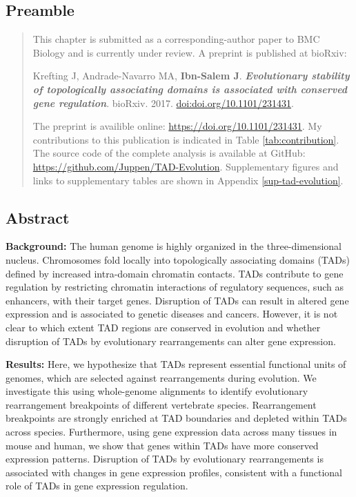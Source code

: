 \documentclass[a4paper,twoside=true,openright,parskip=full,chapterprefix=true,11pt,headings=normal,bibliography=totoc,listof=totoc,titlepage=on,captions=tableabove,draft=false]{scrreprt}
\theoremstyle{definition}
\theoremstyle{definition}
\theoremstyle{definition}
\theoremstyle{remark}
\begin{document}
\hypertarget{preamble-1}{%
\subsection*{Preamble}\label{preamble-1}}

\begin{quote}
This chapter is submitted as a corresponding-author paper to BMC Biology
and is currently under review. A preprint is published at bioRxiv:

Krefting J, Andrade-Navarro MA, \textbf{Ibn-Salem J}.
\textbf{\emph{Evolutionary stability of topologically associating
domains is associated with conserved gene regulation}}. bioRxiv. 2017.
\href{https://doi.org/10.1101/231431}{doi:doi.org/10.1101/231431}.

The preprint is availible online: \url{https://doi.org/10.1101/231431}.
My contributions to this publication is indicated in Table
\ref{tab:contribution}. The source code of the complete analysis is
available at GitHub: \url{https://github.com/Juppen/TAD-Evolution}.
Supplementary figures and links to supplementary tables are shown in
Appendix \ref{sup-tad-evolution}.
\end{quote}

\hypertarget{abstract-2}{%
\subsection*{Abstract}\label{abstract-2}}

\textbf{Background:} The human genome is highly organized in the
three-dimensional nucleus. Chromosomes fold locally into topologically
associating domains (TADs) defined by increased intra-domain chromatin
contacts. TADs contribute to gene regulation by restricting chromatin
interactions of regulatory sequences, such as enhancers, with their
target genes. Disruption of TADs can result in altered gene expression
and is associated to genetic diseases and cancers. However, it is not
clear to which extent TAD regions are conserved in evolution and whether
disruption of TADs by evolutionary rearrangements can alter gene
expression.

\textbf{Results:} Here, we hypothesize that TADs represent essential
functional units of genomes, which are selected against rearrangements
during evolution. We investigate this using whole-genome alignments to
identify evolutionary rearrangement breakpoints of different vertebrate
species. Rearrangement breakpoints are strongly enriched at TAD
boundaries and depleted within TADs across species. Furthermore, using
gene expression data across many tissues in mouse and human, we show
that genes within TADs have more conserved expression patterns.
Disruption of TADs by evolutionary rearrangements is associated with
changes in gene expression profiles, consistent with a functional role
of TADs in gene expression regulation.
\end{document}

